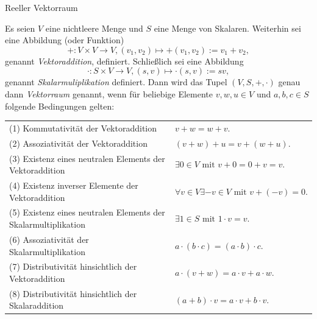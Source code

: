 \documentclass[
  8pt,
  ignorenonframetext,
]{beamer}
\begin{document}
\begin{frame}{Reeller Vektorraum}
\protect\hypertarget{reeller-vektorraum}{}
\vspace{3mm}
\small
{}
\begin{definition}[Vektorraum]
\justifying
\begin{footnotesize}
Es seien $V$ eine nichtleere Menge und $S$ eine Menge von Skalaren. Weiterhin 
sei eine Abbildung (oder Funktion)
\begin{equation}
+ : V \times V \to V, (v_1,v_2) \mapsto +(v_1,v_2) := v_1 + v_2,
\end{equation}
genannt \textit{Vektoraddition}, definiert. Schließlich sei eine Abbildung 
\begin{equation}
\cdot : S \times V \to V, (s,v) \mapsto \cdot(s,v) := sv,
\end{equation}
genannt \textit{Skalarmuliplikation} definiert. Dann wird das Tupel 
$(V,S,+,\cdot)$ genau dann \textit{Vektorraum} genannt, wenn für beliebige 
Elemente $v,w,u \in V$ und $a,b, c \in S$ folgende Bedingungen gelten:

\vspace{6pt}
\begin{tabular}{l l}
(1) Kommutativität der Vektoraddition & $v+w=w+v.$ \\ [2pt]
(2) Assoziativität der Vektoraddition & $(v+w)+u=v+(w+u).$ \\ [2pt]
(3) Existenz eines neutralen Elements der Vektoraddition
  & $\exists 0 \in V \text{ mit } v + 0 = 0 + v = v.$ \\ [2pt]
(4) Existenz inverser Elemente der Vektoraddition
  & $\forall v \in V \exists -v \in V \text{ mit } v+(-v) = 0.$ \\ [2pt]
(5) Existenz eines neutralen Elements der Skalarmultiplikation
  & $\exists 1 \in S \text{ mit } 1 \cdot v = v.$ \\ [2pt]
(6) Assoziativität der Skalarmultiplikation
  & $a \cdot (b \cdot c) = (a \cdot b) \cdot c.$ \\ [2pt]
(7) Distributivität hinsichtlich der Vektoraddition 
  & $a \cdot (v + w) = a \cdot v + a \cdot w.$ \\ [2pt]
(8) Distributivität hinsichtlich der Skalaraddition 
  & $(a+b) \cdot v = a \cdot v + b \cdot v.$
\end{tabular}
\end{footnotesize}
\end{definition}
\end{frame}
\end{document}
